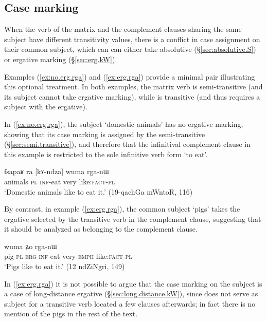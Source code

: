 \subsection{Case marking} \label{sec:complement.clause.case.marking}
When the verb of the matrix and the complement clauses sharing the same subject have different transitivity values, there is a conflict in case assignment on their common subject, which can can either take absolutive (§\ref{sec:absolutive.S}) or ergative marking (§\ref{sec:erg.kW}). 

Examples (\ref{ex:no.erg.rga}) and  (\ref{ex:erg.rga})  provide a minimal pair illustrating this optional treatment. In both examples, the matrix verb  is semi-transitive (and its subject cannot take ergative marking), while  is transitive (and thus requires a subject with the ergative).

In (\ref{ex:no.erg.rga}), the subject  `domestic animals' has no ergative marking, showing that its case marking is assigned by the semi-transitive  (§\ref{sec:semi.transitive}), and therefore that the infinitival complement clause in this example is restricted to the sole infinitive verb form  `to eat'.

\begin{exe}
\ex \label{ex:no.erg.rga}
\gll fsapaʁ ra [kɤ-ndza] wuma rga-nɯ  \\
animals \textsc{pl}  \textsc{inf}-eat very  like:\textsc{fact}-\textsc{pl} \\
\glt `Domestic animals like to eat it.' (19-qachGa mWntoR, 116)
\end{exe}

By contrast, in example (\ref{ex:erg.rga}), the common subject   `pigs' takes the ergative  selected by the transitive verb   in the complement clause, suggesting that it should be analyzed as belonging to the complement clause.

\begin{exe}
\ex \label{ex:erg.rga}
 wuma ʑo rga-nɯ \\
pig \textsc{pl} \textsc{erg} \textsc{inf}-eat very \textsc{emph}  like:\textsc{fact}-\textsc{pl} \\
 \glt `Pigs like to eat it.' (12 ndZiNgri, 149)
\end{exe}

In (\ref{ex:erg.rga}) it is not possible to argue that the case marking on the subject is a case of long-distance ergative (§\ref{sec:long.distance.kW}), since   does not serve as subject for a transitive verb located a few clauses afterwards; in fact there is no mention of the pigs in the rest of the text.


